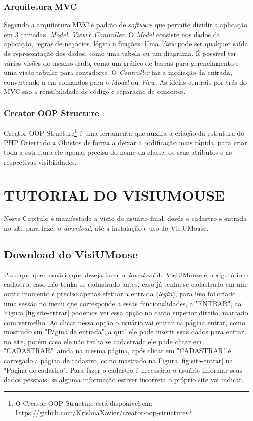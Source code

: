 \subsection{Arquitetura MVC}

Segundo  a arquitetura MVC é padrão de \textit{software} que permite dividir a aplicação em 3 camadas, \textit{Model}, \textit{View} e \textit{Controller}. O \textit{Model} consiste nos dados da aplicação, regras de negócios, lógica e funções. Uma \textit{View} pode ser qualquer saída de representação dos dados, como uma tabela ou um diagrama. É possível ter várias visões do mesmo dado, como um gráfico de barras para gerenciamento e uma visão tabular para contadores. O \textit{Controller} faz a mediação da entrada, convertendo-a em comandos para o \textit{Model} ou \textit{View}. As ideias centrais por trás do MVC são a reusabilidade de código e separação de conceitos.

\subsection{Creator OOP Structure}

Creator OOP Structure\footnote{O Creator OOP Structure está disponível em: https://github.com/KrishnaXavier/creator-oop-structure}  é uma ferramenta que auxilia a criação da estrutura do PHP Orientado a Objetos de forma a deixar a codificação mais rápida, para criar toda a estrutura ele apenas precisa do nome da classe, os seus atributos e as respectivas visibilidades.



\chapter{TUTORIAL DO VISIUMOUSE}\label{CAP-tecnologia-visiumouse}
Neste Capítulo é manifestado a visão do usuário final, desde o cadastro e entrada no site para fazer o \textit{download}, até a instalação e uso do VisiUMouse. 

\section{Download do VisiUMouse}
Para qualquer usuário que deseja fazer o \textit{download} do VisiUMouse é obrigatório o cadastro, caso não tenha se cadastrado antes, caso já tenha se cadastrado em um outro momento é preciso apenas efetuar a entrada (\textit{login}), para isso foi criado uma sessão no menu que corresponde a essas funcionalidades, a "ENTRAR", na Figura \ref{fig:site-entrar} podemos ver essa opção no canto superior direito, marcado com vermelho. Ao clicar nessa opção o usuário vai entrar na página entrar, como mostrado em "Página de entrada", a qual ele pode inserir seus dados para entrar no site, porém caso ele não tenha se cadastrado ele pode clicar em "CADASTRAR", ainda na mesma página, após clicar em "CADASTRAR" é carregado a página de cadastro, como mostrado na Figura \ref{fig:site-entrar} na "Página de cadastro". Para fazer o cadastro é necessário o usuário informar seus dados pessoais, se alguma informação estiver incorreta o próprio site vai indicar. 

